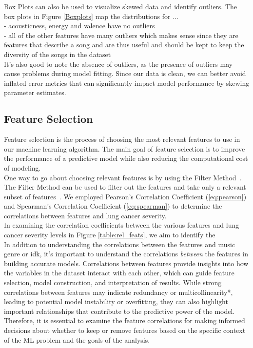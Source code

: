 \documentclass[times, twocolumn]{article}
\begin{document}
Box Plots can also be used to visualize skewed data and identify outliers.
The box plots in Figure \ref{Boxplots} map the distributions for ...\\
- acousticness, energy and valence have no outliers\\
- all of the other features have many outliers which makes sense since they are features that describe a song and are thus useful and should be kept to keep the diversity of the songs in the dataset\\
It's also good to note the absence of outliers, as the presence of outliers may cause problems during model fitting. Since our data is clean, we can better avoid inflated error metrics that can significantly impact model performance by skewing parameter estimates.

\subsection{Feature Selection} Feature selection is the process of choosing the most relevant features to use in our machine learning algorithm. The main goal of feature selection is to improve the performance of a predictive model while also reducing the computational cost of modeling.\\

One way to go about choosing relevant features is by using the Filter Method~\cite{HeavyAI}. The Filter Method can be used to filter out the features and take only a relevant subset of features~\cite{HeavyAI}. We employed Pearson's Correlation Coefficient (\ref{eq:pearson}) and Spearman's Correlation Coefficient (\ref{eq:spearman}) to determine the correlations between features and lung cancer severity.\\


In examining the correlation coefficients between the various features and lung cancer severity levels in Figure \ref{table:rel_feats}, we aim to identify the \\

In addition to understanding the correlations between the features and music genre or idk, it's important to understand the correlations \textit{between} the features in building accurate models. Correlations between features provide insights into how the variables in the dataset interact with each other, which can guide feature selection, model construction, and interpretation of results. While strong correlations between features may indicate redundancy or multicollinearity*, leading to potential model instability or overfitting, they can also highlight important relationships that contribute to the predictive power of the model. Therefore, it is essential to examine the feature correlations for making informed decisions about whether to keep or remove features based on the specific context of the ML problem and the goals of the analysis.\\
\end{document}
